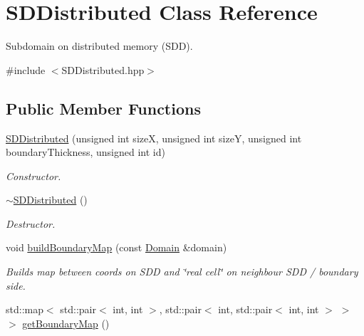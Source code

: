 \hypertarget{classSDDistributed}{
\section{SDDistributed Class Reference}
\label{classSDDistributed}
}


Subdomain on distributed memory (SDD).  


{\ttfamily \#include $<$SDDistributed.hpp$>$}\subsection*{Public Member Functions}
\begin{DoxyCompactItemize}
\item 
\hyperlink{classSDDistributed_a49ef3cd6d1409cc71d3800fd0fca2f28}{SDDistributed} (unsigned int sizeX, unsigned int sizeY, unsigned int boundaryThickness, unsigned int id)
\begin{DoxyCompactList}\small\item\em Constructor. \item\end{DoxyCompactList}\item 
\hypertarget{classSDDistributed_a1af9779279416a7bd519747e3b029124}{
\hyperlink{classSDDistributed_a1af9779279416a7bd519747e3b029124}{$\sim$SDDistributed} ()}
\label{classSDDistributed_a1af9779279416a7bd519747e3b029124}

\begin{DoxyCompactList}\small\item\em Destructor. \item\end{DoxyCompactList}\item 
\hypertarget{classSDDistributed_a995e6fad585afbf4158ea0b323eafc76}{
void \hyperlink{classSDDistributed_a995e6fad585afbf4158ea0b323eafc76}{buildBoundaryMap} (const \hyperlink{classDomain}{Domain} \&domain)}
\label{classSDDistributed_a995e6fad585afbf4158ea0b323eafc76}

\begin{DoxyCompactList}\small\item\em Builds map between coords on SDD and \char`\"{}real cell\char`\"{} on neighbour SDD / boundary side. \item\end{DoxyCompactList}\item 
\hypertarget{classSDDistributed_a3617b83f6f2a6368b1f17c938d921e0a}{
std::map$<$ std::pair$<$ int, int $>$, std::pair$<$ int, std::pair$<$ int, int $>$ $>$ $>$ \hyperlink{classSDDistributed_a3617b83f6f2a6368b1f17c938d921e0a}{getBoundaryMap} ()}
\label{classSDDistributed_a3617b83f6f2a6368b1f17c938d921e0a}


\end{DoxyCompactItemize}
